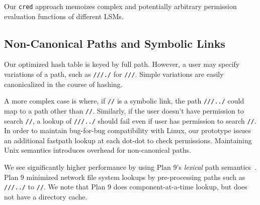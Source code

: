 
Our {\tt cred} approach memoizes complex and potentially arbitrary
permission evaluation functions
of different LSMs. %


\subsection{Non-Canonical Paths and Symbolic Links}

Our optimized hash table is keyed
by full path.  However, a user may specify variations of a path, such as {\tt /\fnone{}/\fntwo{}/./\fnthree{}}
for {\tt /\fnone{}/\fntwo{}/\fnthree{}}.
Simple variations are easily canonicalized in the course of hashing.

A more complex case is where, if {\tt /\fnone{}/\lnone{}} is a symbolic link,
the path {\tt /\fnone{}/\lnone{}/../\fntwo{}} could map to a path other than {\tt /\fnone{}/\fntwo{}}.
Similarly, if the user doesn't have permission to search {\tt /\fnone{}/\fnthree{}}, 
a lookup of {\tt /\fnone{}/\fnthree{}/../\fntwo{}} should fail even if user has permission to search
{\tt /\fnone{}/\fntwo{}}.
In order to maintain bug-for-bug compatibility with Linux,
our prototype issues an additional fastpath lookup at each dot-dot to check
permissions. %
Maintaining Unix semantics introduces overhead for non-canonical paths.

We see significantly higher performance by using
Plan 9's {\em lexical}
path semantics~\citep{pike00lexical}.  %
Plan 9 minimized network file system lookups by pre-processing
paths such as {\tt /\fnone{}/\lnone{}/../\fntwo{}} to {\tt /\fnone{}/\fntwo{}}.
We note that Plan 9 does component-at-a-time lookup, but does not have a directory cache.

